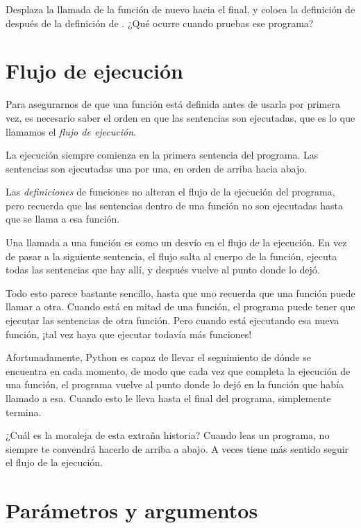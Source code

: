 Desplaza la llamada de la función de nuevo hacia el
final, y coloca la definición de  después de
la definición de . ¿Qué ocurre cuando pruebas
ese programa?

\hypertarget{flujo-de-ejecuciuxf3n}{%
\section{Flujo de ejecución}\label{flujo-de-ejecuciuxf3n}}


Para asegurarnos de que una función está definida antes de usarla por
primera vez, es necesario saber el orden en que las sentencias son
ejecutadas, que es lo que llamamos el \emph{flujo de ejecución}.

La ejecución siempre comienza en la primera sentencia del programa. Las
sentencias son ejecutadas una por una, en orden de arriba hacia abajo.

Las \emph{definiciones} de funciones no alteran el flujo de la ejecución
del programa, pero recuerda que las sentencias dentro de una función no
son ejecutadas hasta que se llama a esa función.

Una llamada a una función es como un desvío en el flujo de la ejecución.
En vez de pasar a la siguiente sentencia, el flujo salta al cuerpo de la
función, ejecuta todas las sentencias que hay allí, y después vuelve al
punto donde lo dejó.

Todo esto parece bastante sencillo, hasta que uno recuerda que una
función puede llamar a otra. Cuando está en mitad de una función, el
programa puede tener que ejecutar las sentencias de otra función. Pero
cuando está ejecutando esa nueva función, ¡tal vez haya que ejecutar
todavía más funciones!

Afortunadamente, Python es capaz de llevar el seguimiento de dónde se
encuentra en cada momento, de modo que cada vez que completa la
ejecución de una función, el programa vuelve al punto donde lo dejó en
la función que había llamado a esa. Cuando esto le lleva hasta el final
del programa, simplemente termina.

¿Cuál es la moraleja de esta extraña historia? Cuando leas un programa,
no siempre te convendrá hacerlo de arriba a abajo. A veces tiene más
sentido seguir el flujo de la ejecución.

\hypertarget{paruxe1metros-y-argumentos}{%
\section{Parámetros y argumentos}\label{paruxe1metros-y-argumentos}}

